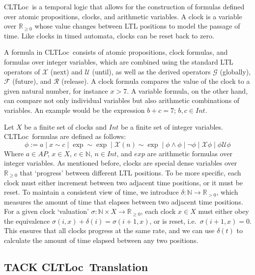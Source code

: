 \documentclass[a4paper,12pt]{article}
\newcommand*\BitOr{\mathbin{|}}
\newcommand{\cltloc}{CLTLoc}
\begin{document}
\cltloc\ is a temporal logic that allows for the construction of formulas
defined over atomic propositions, clocks, and arithmetic variables. A clock is a
variable over \(\mathbb{R}_{\geq 0}\) whose value changes between LTL positions
to model the passage of time. Like clocks in timed automata, clocks can be
reset back to zero.

A formula in \cltloc\ consists of atomic propositions, clock formulas, and
formulas over integer variables, which are combined using the standard LTL
operators of \(\mathcal{X}\) (next) and \(\mathcal{U}\) (until), as well as the
derived operators \(\mathcal{G}\) (globally), \(\mathcal{F}\) (future), and
\(\mathcal{R}\) (release). A clock formula compares the value of the clock to a
given natural number, for instance \(x > 7\). A variable formula, on the other
hand, can compare not only individual variables but also arithmetic combinations
of variables. An example would be the expression \(b + c = 7\); \(b,c \in Int\).

Let \(X\) be a finite set of clocks and \(Int\) be a finite set of integer
variables. \cltloc\ formulas are defined as follows:
\[\phi := a \BitOr x \sim c \BitOr \exp \sim \exp \BitOr \mathcal{X}(n) \sim \exp \BitOr \phi \land \phi \BitOr \neg \phi \BitOr \mathcal{X}\phi \BitOr \phi \mathcal{U} \phi \]
Where \(a \in AP\), \(x \in X\), \(c \in \mathbb{N}\), \(n \in Int\), and
\(exp\) are arithmetic formulas over integer variables. As mentioned before,
clocks are special dense variables over \(\mathbb{R}_{\geq 0}\) that `progress'
between different LTL positions. To be more specific, each clock must either
increment between two adjacent time positions, or it must be reset. To maintain
a consistent view of time, we introduce
\(\delta: \mathbb{N} \rightarrow \mathbb{R}_{>0}\), which measures the amount of
time that elapses between two adjacent time positions. For a given clock
`valuation' \(\sigma: \mathbb{N} \times X \rightarrow \mathbb{R}_{\geq 0}\),
each clock \(x \in X\) must either obey the equivalence
\(\sigma(i,x) + \delta(i) = \sigma(i+1,x)\), or is reset, i.e.\
\(\sigma(i+1,x) = 0\). This ensures that all clocks progress at the same rate,
and we can use \(\delta(t)\) to calculate the amount of time elapsed between any
two positions.

\subsection{TACK \cltloc\ Translation}\label{prelim-tack}
\end{document}
